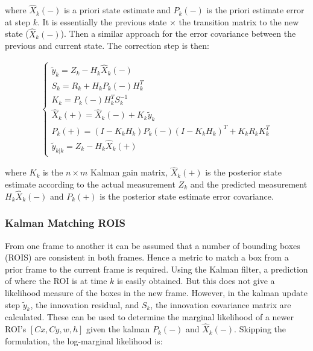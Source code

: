 \documentclass[a4paper,11pt,notitlepage]{article}
\begin{document}
where $\hat{X}_{k}(-)$ is a priori state estimate and $P_{k}(-)$ is the priori estimate error at step $k$. It is essentially the previous state $\times$ the transition matrix to the new state ($\hat{X}_{k}(-)$). Then a similar approach for the error covariance between the previous and current state. The correction step is then:

\begin{equation}
\begin{aligned}
\begin{cases}
\label{kalman_update_equs}
\tilde{y}_{k} = Z_{k} - H_{k} \hat{X}_{k}(-) \\
S_{k} = R_{k} + H_{k}P_{k}(-)H_{k}^{T} \\
K_{k} = P_{k}(-) H_{k}^{T} S_{k}^{-1} \\ 
\hat{X}_{k}(+) = \hat{X}_{k}(-) + K_{k} \tilde{y}_{k}\\
P_{k}(+) = (I-K_{k}H_{k}) P_{k}(-)(I-K_{k}H_{k})^{T} + K_{k}R_{k}K_{k}^{T} \\
\tilde{y}_{k|k} = Z_{k} - H_{k} \hat{X}_{k}(+)

\end{cases}
\end{aligned}
\end{equation}

where $K_{k}$ is the $n \times m$ Kalman gain matrix, $\hat{X}_{k}(+)$ is the posterior state estimate according to the actual measurement $Z_{k}$ and the predicted measurement $H_{k} \hat{X}_{k}(-)$ and $P_{k}(+)$ is the posterior state estimate error covariance.

\subsubsection{Kalman Matching ROIS}

From one frame to another it can be assumed that a number of bounding boxes (ROIS) are consistent in both frames. Hence a metric to match a box from a prior frame to the current frame is required. Using the Kalman filter, a prediction of where the ROI is at time $k$ is easily obtained. But this does not give a likelihood measure of the boxes in the new frame. However, in the kalman update step $\tilde{y}_{k}$, the innovation residual, and $S_{k}$, the innovation covariance matrix are calculated. These can be used to determine the marginal likelihood of a newer ROI's $[Cx,Cy,w,h]$ given the kalman $P_{k}(-)$ and $\hat{X}_{k}(-)$. Skipping the formulation, the log-marginal likelihood is:
\end{document}
